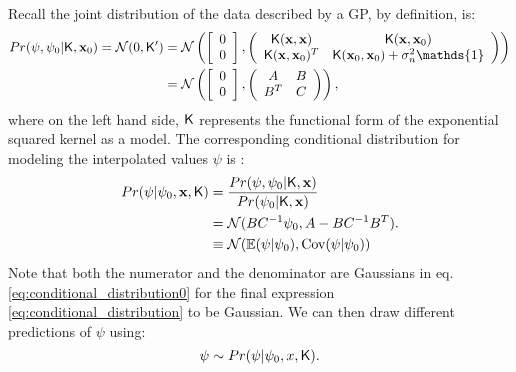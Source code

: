 Recall the joint distribution of the data
described by a GP, by definition, is:
\begin{align}
	Pr(\psi, \psi_0 |\kerngp, \xv_0) = \mathcal{N}(0, \kerngp') &=  \mathcal{N}\left(\left[\begin{array}{c} 0 \\ 0 \end{array} \right], 
	\left(
	\begin{array}{cc}
		\kerngp(\xv, \xv) & \kerngp(\xv, \xv_0) \\
		\kerngp(\xv, \xv_0)^T & \kerngp(\xv_0, \xv_0) + \sigma_n^2 \mathds{1}
	\end{array}
	\right)
	\right)\\
&=  \mathcal{N}\left(\left[\begin{array}{c} 0 \\ 0 \end{array} \right], 
	\left(
	\begin{array}{cc}
		A & B \\
		B^T & C 
	\end{array}
	\right)
	\right),
\end{align}
where on the left hand side, $\mathsf{K}$ represents the functional form of the
exponential squared kernel as a model.
The corresponding conditional distribution for modeling the interpolated values
$\psi$ is \citep{Rasmussen2006}:
\begin{align}
	Pr(\psi | \psi_0, \mathbf{x}, \mathsf{K}) &= \frac{Pr(\psi, \psi_0 |\mathsf{K},
	\mathbf{x})}{Pr(\psi_0 |\mathsf{K}, \mathbf{x})} \label{eq:conditional_distribution0}\\
	&= \mathcal{N}(BC^{-1}\psi_0, A -
	BC^{-1}B^T).\label{eq:conditional_distribution}\\
	& \equiv \mathcal{N}(\mathbb{E}(\psi | \psi_0), \mathrm{Cov}(\psi | \psi_0))
\end{align}
Note that both the numerator and the denominator are Gaussians in eq.
\ref{eq:conditional_distribution0} for the final expression
\ref{eq:conditional_distribution} to be Gaussian. 
We can then draw different predictions of $\psi$ using:
\begin{equation}
	\psi \sim Pr(\psi | \psi_0, x, \mathsf{K}).
\end{equation}

